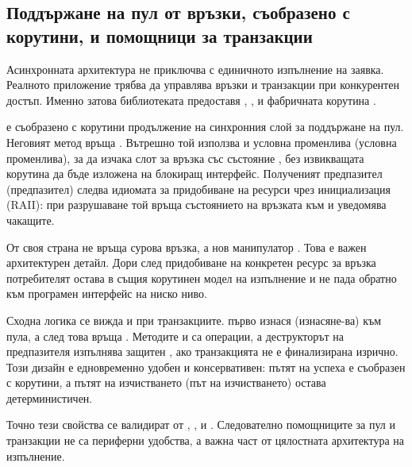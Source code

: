 \subsection{Поддържане на пул от връзки, съобразено с корутини, и помощници за транзакции}

Асинхронната архитектура не приключва с единичното изпълнение на заявка. Реалното приложение трябва да управлява връзки и транзакции при конкурентен достъп. Именно затова библиотеката предоставя , ,  и фабричната корутина .

 е съобразено с корутини продължение на синхронния слой за поддържане на пул. Неговият метод  връща . Вътрешно той използва  и условна променлива (условна променлива), за да изчака слот за връзка със състояние , без извикващата корутина да бъде изложена на блокиращ интерфейс. Полученият предпазител (предпазител) следва идиомата за придобиване на ресурси чрез инициализация (RAII): при разрушаване той връща състоянието на връзката към  и уведомява чакащите.

От своя страна  не връща сурова връзка, а нов манипулатор . Това е важен архитектурен детайл. Дори след придобиване на конкретен ресурс за връзка потребителят остава в същия корутинен модел на изпълнение и не пада обратно към програмен интерфейс на ниско ниво.

Сходна логика се вижда и при транзакциите.  първо изнася (изнасяне-ва)  към пула, а след това връща . Методите  и  са  операции, а деструкторът на предпазителя изпълнява защитен , ако транзакцията не е финализирана изрично. Този дизайн е едновременно удобен и консервативен: пътят на успеха е съобразен с корутини, а пътят на изчистването (път на изчистването) остава детерминистичен.

Точно тези свойства се валидират от , ,  и . Следователно помощниците за пул и транзакции не са периферни удобства, а важна част от цялостната архитектура на изпълнение.

